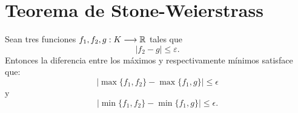 %

\section{Teorema de Stone-Weierstrass }\label{ch:TeoremaStoneWeiertrass}

\begin{lema}\label{ch03:lema:min-max}
    Sean tres funciones $f_1,f_2,g : K \longrightarrow \mathbb{R}$ tales que 
    \begin{equation}
        |f_2 - g| \leq \varepsilon.
    \end{equation}
    Entonces la diferencia entre los máximos 
    y respectivamente mínimos satisface que: 
    \begin{equation}
        |
            \max\{f_1, f_2\}
            -
            \max\{f_1, g\}
        |
        \leq \epsilon
    \end{equation}
    y 
    \begin{equation}
        |
            \min\{f_1, f_2\}
            -
            \min\{f_1, g\}
        |
        \leq \epsilon.
    \end{equation}
\end{lema}
